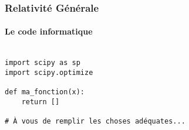 
\begin{frame}[fragile, label=code]
\frametitle{Relativité Générale}
\framesubtitle{Le code informatique}

\begin{code}
\begin{verbatim}

import scipy as sp
import scipy.optimize

def ma_fonction(x):
    return []

# À vous de remplir les choses adéquates...

\end{verbatim}
\end{code}
\end{frame}
